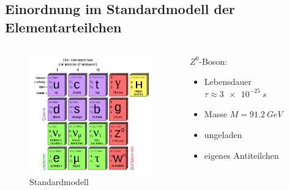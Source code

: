 \subsection{Einordnung im Standardmodell der Elementarteilchen}

\begin{iframe}
	\begin{columns}
	\begin{column}{0.48\textwidth}
		\begin{figure}
			\centering
			\includegraphics[width=5.5cm]{img/standardmodel}
			\caption*{Standardmodell\cite{standardmodel}}
		\end{figure}
	\end{column}
	\begin{column}{0.48\textwidth}
		$Z^0$-Boson:
		\begin{itemize}
			\item Lebensdauer $\tau\approx\SI{3e-25}{s}$
			\item Masse $M=\SI{91.2}{GeV}$
			\item ungeladen
			\item eigenes Antiteilchen
		\end{itemize}
	\end{column}
\end{columns}

\end{iframe}



